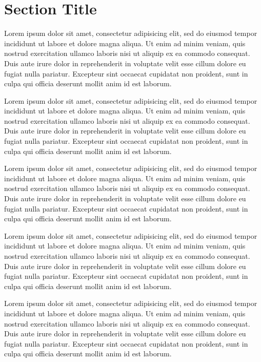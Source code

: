 \section{Section Title}
Lorem ipsum dolor sit amet, consectetur adipisicing elit, sed do eiusmod tempor incididunt ut labore et dolore magna aliqua. Ut enim ad minim veniam, quis nostrud exercitation ullamco laboris nisi ut aliquip ex ea commodo consequat. Duis aute irure dolor in reprehenderit in voluptate velit esse cillum dolore eu fugiat nulla pariatur. Excepteur sint occaecat cupidatat non proident, sunt in culpa qui officia deserunt mollit anim id est laborum.

Lorem ipsum dolor sit amet, consectetur adipisicing elit, sed do eiusmod tempor incididunt ut labore et dolore magna aliqua. Ut enim ad minim veniam, quis nostrud exercitation ullamco laboris nisi ut aliquip ex ea commodo consequat. Duis aute irure dolor in reprehenderit in voluptate velit esse cillum dolore eu fugiat nulla pariatur. Excepteur sint occaecat cupidatat non proident, sunt in culpa qui officia deserunt mollit anim id est laborum.

Lorem ipsum dolor sit amet, consectetur adipisicing elit, sed do eiusmod tempor incididunt ut labore et dolore magna aliqua. Ut enim ad minim veniam, quis nostrud exercitation ullamco laboris nisi ut aliquip ex ea commodo consequat. Duis aute irure dolor in reprehenderit in voluptate velit esse cillum dolore eu fugiat nulla pariatur. Excepteur sint occaecat cupidatat non proident, sunt in culpa qui officia deserunt mollit anim id est laborum.

Lorem ipsum dolor sit amet, consectetur adipisicing elit, sed do eiusmod tempor incididunt ut labore et dolore magna aliqua. Ut enim ad minim veniam, quis nostrud exercitation ullamco laboris nisi ut aliquip ex ea commodo consequat. Duis aute irure dolor in reprehenderit in voluptate velit esse cillum dolore eu fugiat nulla pariatur. Excepteur sint occaecat cupidatat non proident, sunt in culpa qui officia deserunt mollit anim id est laborum.

Lorem ipsum dolor sit amet, consectetur adipisicing elit, sed do eiusmod tempor incididunt ut labore et dolore magna aliqua. Ut enim ad minim veniam, quis nostrud exercitation ullamco laboris nisi ut aliquip ex ea commodo consequat. Duis aute irure dolor in reprehenderit in voluptate velit esse cillum dolore eu fugiat nulla pariatur. Excepteur sint occaecat cupidatat non proident, sunt in culpa qui officia deserunt mollit anim id est laborum.

